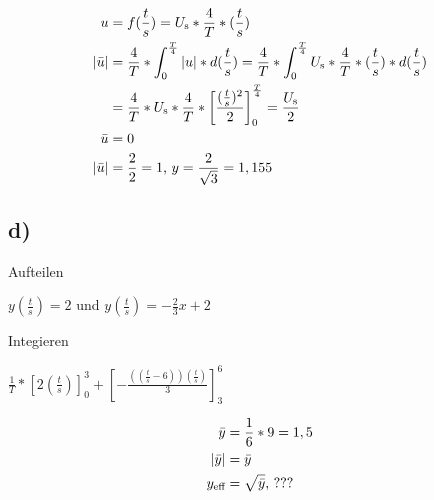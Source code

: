 \documentclass[../../document.tex]{subfiles}
\begin{document}
\begin{equation*}
    \begin{split}
        u &= f(\frac{t}{s}) = U_{\textrm{s}} * \frac{4}{T} * (\frac{t}{s})\\
        \left\lvert\bar{u}\right\rvert &= \frac{4}{T} * \int_{0}^{\frac{T}{4}} \left\lvert u \right\rvert * d (\frac{t}{s}) = \frac{4}{T} * \int_{0}^{\frac{T}{4}} U_{\textrm{s}} * \frac{4}{T} * (\frac{t}{s}) * d (\frac{t}{s}) \\
        &= \frac{4}{T} * U_{\textrm{s}} * \frac{4}{T} * \left[ \frac{(\frac{t}{s})^2}{2} \right]_0^\frac{T}{4} = \frac{U_{\textrm{s}}}{2} \\
        \bar{u} &= 0 \\
        \left\lvert \bar{u} \right\rvert &= \frac{2}{2} = 1 \text{, } y = \frac{2}{\sqrt{3}} = 1,155\\
    \end{split}
\end{equation*}

\subsection*{d)}

Aufteilen

\(y(\frac{t}{s}) = 2\) und \(y(\frac{t}{s}) = -\frac{2}{3}x + 2\)

Integieren

\(\frac{1}{T} * \left[ 2 ( \frac{t}{s} ) \right]_0^3 + \left[ - \frac{((\frac{t}{s} - 6))(\frac{t}{s})}{3} \right]_3^6 \)

\begin{equation*}
    \begin{split}
        \bar{y} &= \frac{1}{6} * 9 = 1,5\\
        \left\lvert \bar{y} \right\rvert &= \bar{y}\\
        y_{\textrm{eff}} &= \sqrt{\bar{y}}\text{, ???}\\
    \end{split}
\end{equation*}
\end{document}
